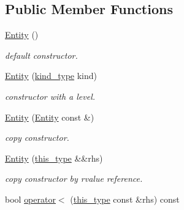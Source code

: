 \subsection*{Public Member Functions}
\begin{DoxyCompactItemize}
\item 
\hyperlink{classhryky_1_1log_1_1level_1_1_entity_a362bef946c5f6869f60f5dc2a92fd22c}{Entity} ()
\begin{DoxyCompactList}\small\item\em default constructor. \end{DoxyCompactList}\item 
\hypertarget{classhryky_1_1log_1_1level_1_1_entity_a9ad61e8d2e6ee5b776628cd2e3b3ed41}{\hyperlink{classhryky_1_1log_1_1level_1_1_entity_a9ad61e8d2e6ee5b776628cd2e3b3ed41}{Entity} (\hyperlink{classhryky_1_1_kind}{kind\-\_\-type} kind)}\label{classhryky_1_1log_1_1level_1_1_entity_a9ad61e8d2e6ee5b776628cd2e3b3ed41}

\begin{DoxyCompactList}\small\item\em constructor with a level. \end{DoxyCompactList}\item 
\hypertarget{classhryky_1_1log_1_1level_1_1_entity_a39bbc444ed1a49d0bd11cd01768858e8}{\hyperlink{classhryky_1_1log_1_1level_1_1_entity_a39bbc444ed1a49d0bd11cd01768858e8}{Entity} (\hyperlink{classhryky_1_1log_1_1level_1_1_entity}{Entity} const \&)}\label{classhryky_1_1log_1_1level_1_1_entity_a39bbc444ed1a49d0bd11cd01768858e8}

\begin{DoxyCompactList}\small\item\em copy constructor. \end{DoxyCompactList}\item 
\hypertarget{classhryky_1_1log_1_1level_1_1_entity_a9f3eff4765889eb545dc69cca9cdb115}{\hyperlink{classhryky_1_1log_1_1level_1_1_entity_a9f3eff4765889eb545dc69cca9cdb115}{Entity} (\hyperlink{classhryky_1_1log_1_1level_1_1_entity_a0d62d1d88c70320c6187fc9580077fea}{this\-\_\-type} \&\&rhs)}\label{classhryky_1_1log_1_1level_1_1_entity_a9f3eff4765889eb545dc69cca9cdb115}

\begin{DoxyCompactList}\small\item\em copy constructor by rvalue reference. \end{DoxyCompactList}\item 
\hypertarget{classhryky_1_1log_1_1level_1_1_entity_aac74619040af7f4dbb92c707e7ce18ef}{bool \hyperlink{classhryky_1_1log_1_1level_1_1_entity_aac74619040af7f4dbb92c707e7ce18ef}{operator$<$} (\hyperlink{classhryky_1_1log_1_1level_1_1_entity_a0d62d1d88c70320c6187fc9580077fea}{this\-\_\-type} const \&rhs) const }\label{classhryky_1_1log_1_1level_1_1_entity_aac74619040af7f4dbb92c707e7ce18ef}


\end{DoxyCompactItemize}
